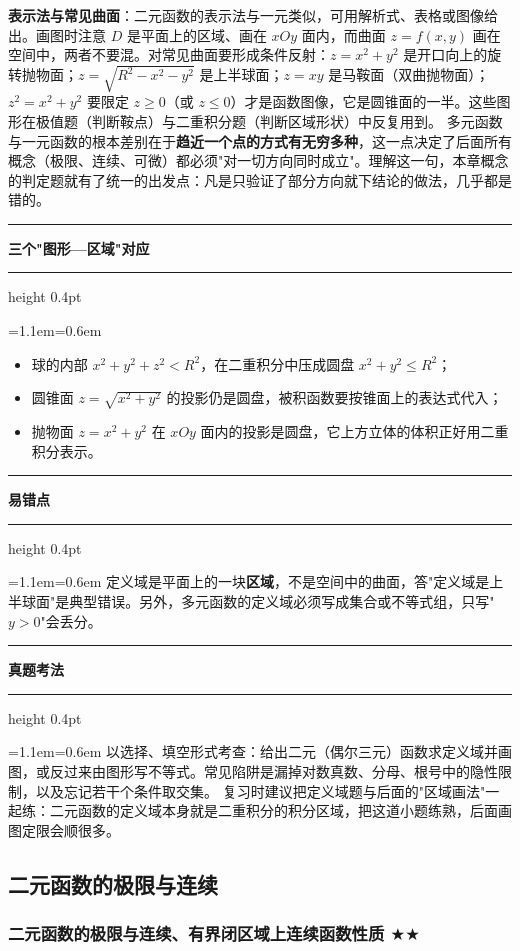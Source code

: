 \documentclass[11pt,openany,UTF8]{ctexbook}
\newcommand{\callouthead}[2]{%
  \par\addvspace{7pt}\noindent
  {\color{#1}\rule[-0.15em]{3pt}{1.05em}}\hspace{0.5em}%
  {\bfseries\color{#1}#2}\par\nobreak\vspace{-0.35em}%
  {\color{rulesep}\hrule height 0.4pt}\nobreak\vspace{0.45em}%
  \begingroup\small\setlength{\parindent}{0pt}%
  \leftskip=1.1em\rightskip=0.6em\noindent\ignorespaces}
\newcommand{\calloutend}{\par\endgroup\addvspace{7pt}}
\newenvironment{callkey}[1]{\callouthead{keybar}{#1}}{\calloutend}
\newenvironment{callwarn}[1]{\callouthead{warnbar}{#1}}{\calloutend}
\newenvironment{callexam}[1]{\callouthead{exambar}{#1}}{\calloutend}
\begin{document}
\textbf{表示法与常见曲面}：二元函数的表示法与一元类似，可用解析式、表格或图像给出。画图时注意 $D$ 是平面上的区域、画在 $xOy$ 面内，而曲面 $z=f(x,y)$ 画在空间中，两者不要混。对常见曲面要形成条件反射：$z=x^{2}+y^{2}$ 是开口向上的旋转抛物面；$z=\sqrt{R^{2}-x^{2}-y^{2}}$ 是上半球面；$z=xy$ 是马鞍面（双曲抛物面）；$z^{2}=x^{2}+y^{2}$ 要限定 $z\ge 0$（或 $z\le 0$）才是函数图像，它是圆锥面的一半。这些图形在极值题（判断鞍点）与二重积分题（判断区域形状）中反复用到。 多元函数与一元函数的根本差别在于\textbf{趋近一个点的方式有无穷多种}，这一点决定了后面所有概念（极限、连续、可微）都必须"对一切方向同时成立"。理解这一句，本章概念的判定题就有了统一的出发点：凡是只验证了部分方向就下结论的做法，几乎都是错的。

\begin{callkey}{三个"图形—区域"对应}
\begin{itemize}
\item 球的内部 $x^{2}+y^{2}+z^{2}<R^{2}$，在二重积分中压成圆盘 $x^{2}+y^{2}\le R^{2}$；
\item 圆锥面 $z=\sqrt{x^{2}+y^{2}}$ 的投影仍是圆盘，被积函数要按锥面上的表达式代入；
\item 抛物面 $z=x^{2}+y^{2}$ 在 $xOy$ 面内的投影是圆盘，它上方立体的体积正好用二重积分表示。
\end{itemize}
\end{callkey}

\begin{callwarn}{易错点}
定义域是平面上的一块\textbf{区域}，不是空间中的曲面，答"定义域是上半球面"是典型错误。另外，多元函数的定义域必须写成集合或不等式组，只写"$y>0$"会丢分。

\end{callwarn}

\begin{callexam}{真题考法}
以选择、填空形式考查：给出二元（偶尔三元）函数求定义域并画图，或反过来由图形写不等式。常见陷阱是漏掉对数真数、分母、根号中的隐性限制，以及忘记若干个条件取交集。 复习时建议把定义域题与后面的"区域画法"一起练：二元函数的定义域本身就是二重积分的积分区域，把这道小题练熟，后面画图定限会顺很多。

\end{callexam}

\subsection{二元函数的极限与连续}

\subsubsection{二元函数的极限与连续、有界闭区域上连续函数性质 $\bigstar$$\bigstar$}
\end{document}
